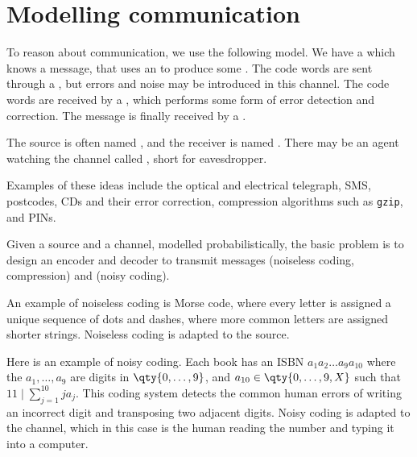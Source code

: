 \section{Modelling communication}

To reason about communication, we use the following model.
We have a  which knows a message, that uses an  to produce some .
The code words are sent through a , but errors and noise may be introduced in this channel.
The code words are received by a , which performs some form of error detection and correction.
The message is finally received by a .

The source is often named , and the receiver is named .
There may be an agent watching the channel called , short for eavesdropper.

Examples of these ideas include the optical and electrical telegraph, SMS, postcodes, CDs and their error correction, compression algorithms such as \texttt{gzip}, and PINs.

Given a source and a channel, modelled probabilistically, the basic problem is to design an encoder and decoder to transmit messages  (noiseless coding, compression) and  (noisy coding).

An example of noiseless coding is Morse code, where every letter is assigned a unique sequence of dots and dashes, where more common letters are assigned shorter strings.
Noiseless coding is adapted to the source.

Here is an example of noisy coding.
Each book has an ISBN $a_1 a_2 \dots a_9 a_{10}$ where the $a_1, \dots, a_9$ are digits in $\qty{0, \dots, 9}$, and $a_{10} \in \qty{0, \dots, 9, X}$ such that $11 \mid \sum_{j=1}^{10} j a_j$.
This coding system detects the common human errors of writing an incorrect digit and transposing two adjacent digits.
Noisy coding is adapted to the channel, which in this case is the human reading the number and typing it into a computer.

